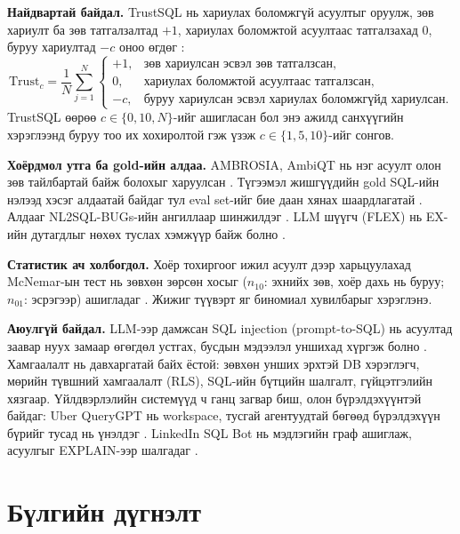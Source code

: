 \textbf{Найдвартай байдал.} TrustSQL нь хариулах боломжгүй асуултыг оруулж, зөв хариулт ба зөв татгалзалтад $+1$,
хариулах боломжтой асуултаас татгалзахад $0$, буруу хариултад $-c$ оноо өгдөг \cite{lee_2024_trustsql}:
\begin{equation}
\mathrm{Trust}_c = \frac{1}{N}\sum_{j=1}^{N}
\begin{cases}
+1, & \text{зөв хариулсан эсвэл зөв татгалзсан},\\
0, & \text{хариулах боломжтой асуултаас татгалзсан},\\
-c, & \text{буруу хариулсан эсвэл хариулах боломжгүйд хариулсан}.
\end{cases}
\label{eq:trust}
\end{equation}
TrustSQL өөрөө $c \in \{0, 10, N\}$-ийг ашигласан бол энэ ажилд санхүүгийн хэрэглээнд буруу тоо их хохиролтой гэж
үзэж $c \in \{1, 5, 10\}$-ийг сонгов.

\textbf{Хоёрдмол утга ба gold-ийн алдаа.} AMBROSIA, AmbiQT нь нэг асуулт олон зөв тайлбартай байж болохыг харуулсан
\cite{saparina_2024_ambrosia, bhaskar_2023_ambiqt}. Түгээмэл жишгүүдийн gold SQL-ийн нэлээд хэсэг алдаатай
байдаг тул eval set-ийг бие даан хянах шаардлагатай \cite{jin_2026_annotation_errors, wretblad_2024_bird_noise}.
Алдааг NL2SQL-BUGs-ийн ангиллаар шинжилдэг \cite{liu_2025_nl2sql_bugs}. LLM шүүгч (FLEX) нь EX-ийн дутагдлыг
нөхөх туслах хэмжүүр байж болно \cite{kim_2025_flex}.

\textbf{Статистик ач холбогдол.} Хоёр тохиргоог ижил асуулт дээр харьцуулахад McNemar-ын тест нь зөвхөн зөрсөн
хосыг ($n_{10}$: эхнийх зөв, хоёр дахь нь буруу; $n_{01}$: эсрэгээр) ашигладаг \cite{mcnemar_1947}. Жижиг түүвэрт яг
биномиал хувилбарыг хэрэглэнэ.

\textbf{Аюулгүй байдал.} LLM-ээр дамжсан SQL injection (prompt-to-SQL) нь асуултад заавар нуух замаар өгөгдөл
устгах, бусдын мэдээлэл уншихад хүргэж болно \cite{pedro_2025_p2sql}. Хамгаалалт нь давхаргатай байх ёстой: зөвхөн
унших эрхтэй DB хэрэглэгч, мөрийн түвшний хамгаалалт (RLS), SQL-ийн бүтцийн шалгалт, гүйцэтгэлийн хязгаар. Үйлдвэрлэлийн
системүүд ч ганц загвар биш, олон бүрэлдэхүүнтэй байдаг: Uber QueryGPT нь workspace, тусгай агентуудтай бөгөөд
бүрэлдэхүүн бүрийг тусад нь үнэлдэг \cite{uber_querygpt}. LinkedIn SQL Bot нь мэдлэгийн граф ашиглаж, асуулгыг
EXPLAIN-ээр шалгадаг \cite{linkedin_sqlbot}.

\section{Бүлгийн дүгнэлт}
\label{sec:ch1-summary}

